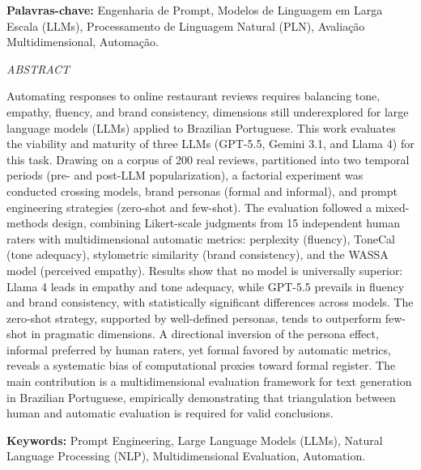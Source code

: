 \documentclass[12pt, a4paper]{article}
\numberwithin{equation}{section}
\begin{document}
\textbf{Palavras-chave:} Engenharia de Prompt, Modelos de Linguagem em Larga Escala (LLMs), Processamento de Linguagem Natural (PLN), Avaliação Multidimensional, Automação.

\newpage
\thispagestyle{empty}
{\begin{center}\textit{\normalsize ABSTRACT}\vspace{36pt}\end{center}}

Automating responses to online restaurant reviews requires balancing tone, empathy, fluency, and brand consistency, dimensions still underexplored for large language models (LLMs) applied to Brazilian Portuguese. This work evaluates the viability and maturity of three LLMs (GPT-5.5, Gemini 3.1, and Llama 4) for this task. Drawing on a corpus of 200 real reviews, partitioned into two temporal periods (pre- and post-LLM popularization), a factorial experiment was conducted crossing models, brand personas (formal and informal), and prompt engineering strategies (zero-shot and few-shot). The evaluation followed a mixed-methods design, combining Likert-scale judgments from 15 independent human raters with multidimensional automatic metrics: perplexity (fluency), ToneCal (tone adequacy), stylometric similarity (brand consistency), and the WASSA model (perceived empathy). Results show that no model is universally superior: Llama 4 leads in empathy and tone adequacy, while GPT-5.5 prevails in fluency and brand consistency, with statistically significant differences across models. The zero-shot strategy, supported by well-defined personas, tends to outperform few-shot in pragmatic dimensions. A directional inversion of the persona effect, informal preferred by human raters, yet formal favored by automatic metrics, reveals a systematic bias of computational proxies toward formal register. The main contribution is a multidimensional evaluation framework for text generation in Brazilian Portuguese, empirically demonstrating that triangulation between human and automatic evaluation is required for valid conclusions.

\textbf{Keywords:} Prompt Engineering, Large Language Models (LLMs), Natural Language Processing (NLP), Multidimensional Evaluation, Automation.



\newpage
\pagestyle{empty}
\listoffigures
\clearpage
\newpage
\pagestyle{empty}
\listoftables
\clearpage
\newpage
\pagestyle{empty}
\end{document}
